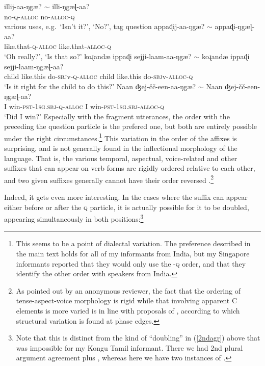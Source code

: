 \documentclass[output=paper, modfonts, nonflat]{langsci/langscibook}
\begin{document}
\ea
 \ea\label{illiya}\gll illij-aa-ŋgæ? $\sim$ illi-ŋgæɭ-aa?\\
 no-\textsc{q}-\textsc{alloc}{} {} no-\textsc{alloc}-\textsc{q}\\
 \glt various uses, e.g.\ `Isn't it?', `No?', tag question
 \ex\label{apdiya}\gll appaɖij-aa-ŋgæ? $\sim$ appaɖi-ŋgæɭ-aa?\\
 like.that-\textsc{q}-\textsc{alloc}{} {} like.that-\textsc{alloc}-\textsc{q}\\
 \glt `Oh really?', `Is that so?' 
 \ex\label{child}\gll koɻandæ{} ippaɖi sejji-laam-aa-ŋgæ? $\sim$
 koɻandæ{} ippaɖi sejji-laam-ŋgæɭ-aa?\\ 
 child like.this do-\textsc{sbj}v-\textsc{q}-\textsc{alloc}{} {} child like.this do-\textsc{sbj}v-\textsc{alloc}-\textsc{q}\\ 
 \glt `Is it right for the child to do this?'
 \ex\label{winning}\gll Naan ʤej-\v{c}\v{c}-een-aa-ŋgæ? $\sim$ Naan ʤej-\v{c}\v{c}-een-ŋgæɭ-aa?\\
 I win-\textsc{pst}-1\textsc{sg}.\textsc{sbj}-\textsc{q}-\textsc{alloc}{} {} I win-\textsc{pst}-1\textsc{sg}.\textsc{sbj}-\textsc{alloc}-\textsc{q}\\
 \glt `Did I win?'
 \z
\z
%
Especially with the fragment utterances, the order with the \allagr{}
preceding the question particle is the prefered one, but both are
entirely possible under the right circumstances.\footnote{This seems
  to be a point of dialectal variation. The preference described in
  the main text holds for all of my informants from India, but my
  Singapore informants reported that they would only use the
  \allagr-\textsc{q} order, and that they identify the other order
  with speakers from India.} This variation in the order of the
affixes is surprising, and is not generally found in the inflectional
morphology of the language. That is, the various temporal, aspectual,
voice-related and other suffixes that can appear on verb forms are
rigidly ordered relative to each other, and two given suffixes
generally cannot have their order reversed \citep[for extended
discussion on this point,
see][]{sundaresanmcfadden:tamtrans}.\footnote{As pointed out by an
  anonymous reviewer, the fact that the ordering of tense-aspect-voice
  morphology is rigid while that involving apparent C elements is more
  varied is in line with proposals of \citet{aboh:2015}, according to
  which structural variation is found at phase edges.}

Indeed, it gets even more interesting. In the cases where the
\allagr{} suffix can appear either before or after the \textsc{q}
particle, it is actually possible for it to be doubled, appearing
simultaneously in both positions:\footnote{Note that this is distinct
  from the kind of ``doubling'' in (\ref{2ndagr}) above that was
  impossible for my Kongu Tamil informant. There we had 2nd plural
  argument agreement plus \allagr, whereas here we have two instances
  of \allagr.}
\end{document}
